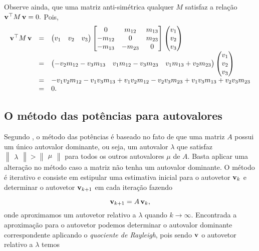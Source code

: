 Observe ainda, que uma matriz anti-simétrica qualquer $M$ satisfaz a relação ${\bf v}^\top M\,{\bf v}=0.$ Pois,
\begin{equation*}
\begin{array}{rcl}
{\bf v}^\top M\,{\bf v}
&=&
\begin{pmatrix}
v_1&v_2&v_3
\end{pmatrix}
\begin{bmatrix}
0&m_{12}&m_{13}\\
-m_{12}&0&m_{23}\\
-m_{13}&-m_{23}&0
\end{bmatrix}
\begin{pmatrix}
v_1\\
v_2\\
v_3
\end{pmatrix}\\
&=&
\begin{pmatrix}
-v_2 m_{12}-v_3 m_{13}&v_1 m_{12}-v_3 m_{23}&v_1 m_{13}+v_2 m_{23}
\end{pmatrix}
\begin{pmatrix}
v_1\\
v_2\\
v_3
\end{pmatrix}\\
&=&
-v_1 v_2 m_{12}-v_1 v_3 m_{13}+v_1 v_2 m_{12}-v_2 v_3 m_{23}+v_1 v_3 m_{13}+v_2 v_3 m_{23}\\
&=&0.
\end{array}
\end{equation*}

\subsection{O método das potências para autovalores}\label{sec.potencias-autovalores}
Segundo \citep{cox-using}, o método das potências é baseado no fato de que uma matriz $A$ possui um único autovalor dominante, ou seja, um autovalor $\lambda$ que satisfaz $\begin{Vmatrix}\lambda\end{Vmatrix} > \begin{Vmatrix}\mu\end{Vmatrix}$ para todos os outros autovalores $\mu$ de $A$. Basta aplicar uma alteração no método caso a matriz não tenha um autovalor dominante. O método é iterativo e consiste em estipular uma estimativa inicial para o autovetor ${\bf v}_k$ e determinar o autovetor ${\bf v}_{k+1}$ em cada iteração fazendo

\begin{equation*}
{\bf v}_{k+1}=A\,{\bf v}_k,
\end{equation*}
onde aproximamos um autovetor relativo a $\lambda$ quando $k\rightarrow \infty$. Encontrada a aproximação para o autovetor podemos determinar o autovalor dominante correspondente aplicando o \textit{quociente de Rayleigh}, pois sendo ${\bf v}$ o autovetor relativo a $\lambda$ temos

